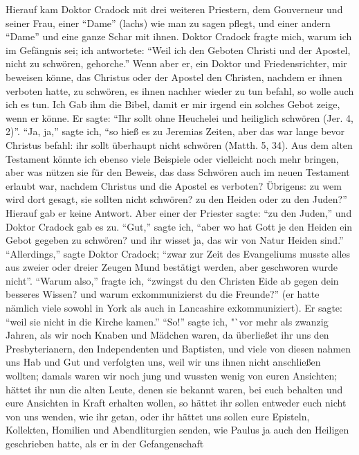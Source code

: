 Hierauf kam Doktor Cradock mit drei weiteren Priestern,
dem Gouverneur und seiner Frau, einer "`Dame"' (lachs) wie
man zu sagen pflegt, und einer andern "`Dame"' und eine ganze
Schar mit ihnen. Doktor Cradock fragte mich, warum ich im
Gefängnis sei; ich antwortete: "`Weil ich den Geboten Christi und
der Apostel, nicht zu schwören, gehorche."' Wenn aber er, ein
Doktor und Friedensrichter, mir beweisen könne, das Christus
oder der Apostel den Christen, nachdem er ihnen verboten hatte,
zu schwören, es ihnen nachher wieder zu tun befahl, so wolle
auch ich es tun. Ich Gab ihm die Bibel, damit er mir irgend
ein solches Gebot zeige, wenn er könne. Er sagte: "`Ihr sollt
ohne Heuchelei und heiliglich schwören (Jer. 4, 2)"'. "`Ja, ja,"' sagte
ich, "`so hieß es zu Jeremias Zeiten, aber das war lange bevor
Christus befahl: ihr sollt überhaupt nicht schwören (Matth. 5, 34).
Aus dem alten Testament könnte ich ebenso viele Beispiele oder vielleicht
noch mehr bringen, aber was nützen sie für den Beweis, das dass
Schwören auch im neuen Testament erlaubt war, nachdem Christus
und die Apostel es verboten? Übrigens: zu wem wird dort gesagt, 
sie sollten nicht schwören? zu den Heiden oder zu den Juden?"'
Hierauf gab er keine Antwort. Aber einer der Priester sagte:
"`zu den Juden,"' und Doktor Cradock gab es zu. "`Gut,"' sagte
ich, "`aber wo hat Gott je den Heiden ein Gebot gegeben zu
schwören? und ihr wisset ja, das wir von Natur Heiden sind."'
"`Allerdings,"' sagte Doktor Cradock; "`zwar zur Zeit des 
Evangeliums musste alles aus zweier oder dreier Zeugen Mund bestätigt
werden, aber geschworen wurde nicht"'. "`Warum also,"' fragte ich,
"`zwingst du den Christen Eide ab gegen dein besseres Wissen?
und warum exkommunizierst du die Freunde?"' (er hatte nämlich
viele sowohl in York als auch in Lancashire exkommuniziert). Er
sagte: "`weil sie nicht in die Kirche kamen."' "`So!"' sagte ich,
"`vor mehr als zwanzig Jahren, als wir noch Knaben und Mädchen
waren, da überließet ihr uns den Presbyterianern, den Independenten 
und Baptisten, und viele von diesen nahmen uns Hab und
Gut und verfolgten uns, weil wir uns ihnen nicht anschließen
wollten; damals waren wir noch jung und wussten wenig
von euren Ansichten; hättet ihr nun die alten Leute, denen sie
bekannt waren, bei euch behalten und eure Ansichten in Kraft
erhalten wollen, so hättet ihr sollen entweder euch nicht von uns
wenden, wie ihr getan, oder ihr hättet uns sollen eure Episteln,
Kollekten, Homilien und Abendliturgien senden, wie Paulus ja
auch den Heiligen geschrieben hatte, als er in der Gefangenschaft
